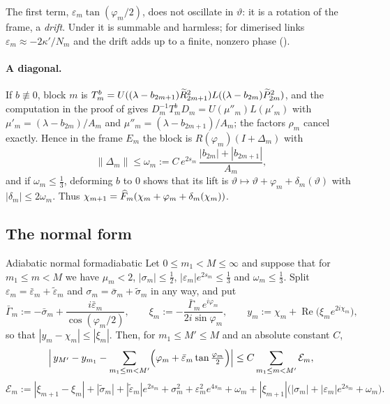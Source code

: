 The first term, $\varepsilon_m\tan(\varphi_m/2)$, does not oscillate in $\vartheta$: it is a
rotation of the frame, a \emph{drift}. Under  it is summable and harmless;
for dimerised links $\varepsilon_m\approx-2\kappa'/N_m$ and the drift adds up to a
finite, nonzero phase ().

\paragraph{A diagonal.} If $b\not\equiv0$, block $m$ is
$T^b_m=U((\lambda-b_{2m+1})\widetilde R_{2m+1}^2)L((\lambda-b_{2m})\widetilde P_{2m}^2)$, and the computation
in the proof of  gives
$D_m^{-1}T^b_mD_m=U(\mu''_m)L(\mu'_m)$ with $\mu'_m=(\lambda-b_{2m})/A_m$ and
$\mu''_m=(\lambda-b_{2m+1})/A_m$; the factors $\rho_m$ cancel exactly. Hence in the frame
$E_m$ the block is $R(\varphi_m)(I+\Delta_m)$ with
\begin{equation}\label{eq:omega}
  \|\Delta_m\|\le\omega_m:=C\,e^{2s_m}\,\frac{|b_{2m}|+|b_{2m+1}|}{A_m},
\end{equation}
and if $\omega_m\le\frac13$, deforming $b$ to $0$ shows that its lift is
$\vartheta\mapsto\vartheta+\varphi_m+\delta_m(\vartheta)$ with $|\delta_m|\le2\omega_m$. Thus
$\chi_{m+1}=\widehat F_m(\chi_m+\varphi_m+\delta_m(\chi_m))$.

\subsection{The normal form}

\begin{proposition}{Adiabatic normal form}{adiabatic}
Let $0\le m_1<M\le\infty$ and suppose that for $m_1\le m<M$ we have $\mu_m<2$,
$|\sigma_m|\le\frac12$, $|\varepsilon_m|e^{2s_m}\le\frac13$ and $\omega_m\le\frac13$. Split
$\varepsilon_m=\bar\varepsilon_m+\tilde\varepsilon_m$ and $\sigma_m=\bar\sigma_m+\tilde\sigma_m$ in
any way, and put
\[
  \bar\Gamma_m:=-\bar\sigma_m+\frac{i\bar\varepsilon_m}{\cos(\varphi_m/2)},\qquad
  \xi_m:=-\frac{\bar\Gamma_m\,e^{i\varphi_m}}{2i\sin\varphi_m},\qquad
  y_m:=\chi_m+\operatorname{Re}\bigl(\xi_me^{2i\chi_m}\bigr),
\]
so that $|y_m-\chi_m|\le|\xi_m|$.
Then, for $m_1\le M'\le M$ and an absolute constant $C$,
\[
  \Bigl|\,y_{M'}-y_{m_1}-\sum_{m_1\le m<M'}\Bigl(\varphi_m+\bar\varepsilon_m\tan\tfrac{\varphi_m}{2}\Bigr)\Bigr|
  \le C\sum_{m_1\le m<M'}\mathcal E_m,
\]
\[
  \mathcal E_m:=|\xi_{m+1}-\xi_m|+|\tilde\sigma_m|+|\tilde\varepsilon_m|e^{2s_m}+\sigma_m^2
  +\varepsilon_m^2e^{4s_m}+\omega_m+|\xi_{m+1}|\bigl(|\sigma_m|+|\varepsilon_m|e^{2s_m}+\omega_m\bigr).
\]
\end{proposition}

